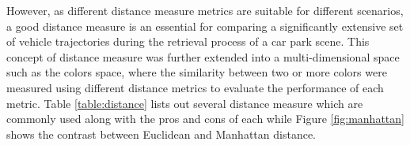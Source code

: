 However, as different distance measure metrics are suitable for different scenarios, a good distance measure is an essential for comparing a significantly extensive set of vehicle trajectories during the retrieval process of a car park scene. This concept of distance measure was further extended into a multi-dimensional space such as the colors space, where the similarity between two or more colors were measured using different distance metrics to evaluate the performance of each metric. Table \ref{table:distance} lists out several distance measure which are commonly used along with the pros and cons of each while Figure \ref{fig:manhattan} shows the contrast between Euclidean and Manhattan distance.

\begin{table}[]
\label{table:distance}
\end{table}



